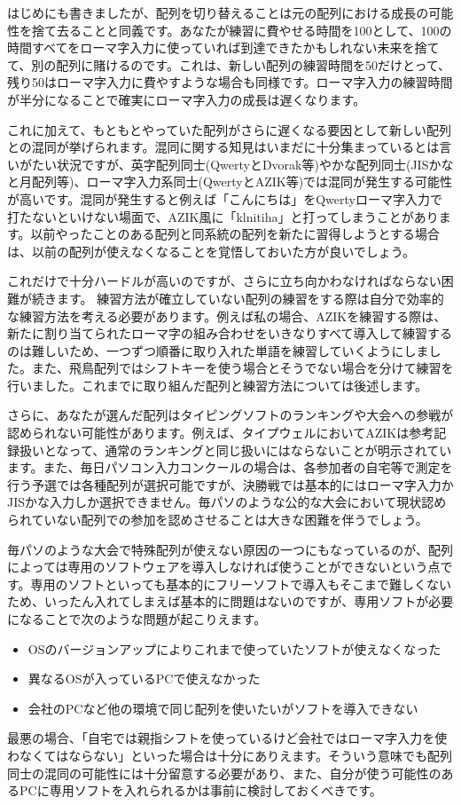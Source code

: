 はじめにも書きましたが、配列を切り替えることは元の配列における成長の可能性を捨て去ることと同義です。あなたが練習に費やせる時間を100として、100の時間すべてをローマ字入力に使っていれば到達できたかもしれない未来を捨てて、別の配列に賭けるのです。これは、新しい配列の練習時間を50だけとって、残り50はローマ字入力に費やすような場合も同様です。ローマ字入力の練習時間が半分になることで確実にローマ字入力の成長は遅くなります。

これに加えて、もともとやっていた配列がさらに遅くなる要因として新しい配列との混同が挙げられます。混同に関する知見はいまだに十分集まっているとは言いがたい状況ですが、英字配列同士(QwertyとDvorak等)やかな配列同士(JISかなと月配列等)、ローマ字入力系同士(QwertyとAZIK等)では混同が発生する可能性が高いです。混同が発生すると例えば「こんにちは」をQwertyローマ字入力で打たないといけない場面で、AZIK風に「klnitiha」と打ってしまうことがあります。以前やったことのある配列と同系統の配列を新たに習得しようとする場合は、以前の配列が使えなくなることを覚悟しておいた方が良いでしょう。

これだけで十分ハードルが高いのですが、さらに立ち向かわなければならない困難が続きます。
練習方法が確立していない配列の練習をする際は自分で効率的な練習方法を考える必要があります。例えば私の場合、AZIKを練習する際は、新たに割り当てられたローマ字の組み合わせをいきなりすべて導入して練習するのは難しいため、一つずつ順番に取り入れた単語を練習していくようにしました。また、飛鳥配列ではシフトキーを使う場合とそうでない場合を分けて練習を行いました。これまでに取り組んだ配列と練習方法については後述します。

さらに、あなたが選んだ配列はタイピングソフトのランキングや大会への参戦が認められない可能性があります。例えば、タイプウェルにおいてAZIKは参考記録扱いとなって、通常のランキングと同じ扱いにはならないことが明示されています。また、毎日パソコン入力コンクールの場合は、各参加者の自宅等で測定を行う予選では各種配列が選択可能ですが、決勝戦では基本的にはローマ字入力かJISかな入力しか選択できません。毎パソのような公的な大会において現状認められていない配列での参加を認めさせることは大きな困難を伴うでしょう。

毎パソのような大会で特殊配列が使えない原因の一つにもなっているのが、配列によっては専用のソフトウェアを導入しなければ使うことができないという点です。専用のソフトといっても基本的にフリーソフトで導入もそこまで難しくないため、いったん入れてしまえば基本的に問題はないのですが、専用ソフトが必要になることで次のような問題が起こりえます。
\begin{itemize}
 \item OSのバージョンアップによりこれまで使っていたソフトが使えなくなった
 \item 異なるOSが入っているPCで使えなかった
 \item 会社のPCなど他の環境で同じ配列を使いたいがソフトを導入できない
\end{itemize}
最悪の場合、「自宅では親指シフトを使っているけど会社ではローマ字入力を使わなくてはならない」といった場合は十分にありえます。そういう意味でも配列同士の混同の可能性には十分留意する必要があり、また、自分が使う可能性のあるPCに専用ソフトを入れられるかは事前に検討しておくべきです。


